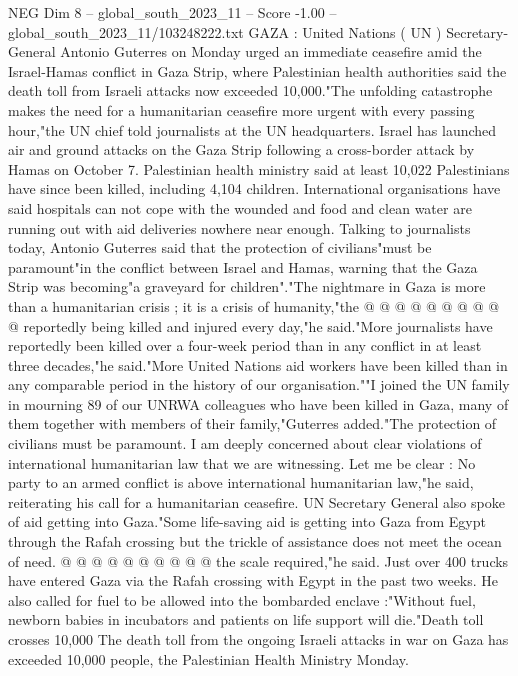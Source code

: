 \begin{textsample}{NEG Dim 8 – global\_south\_2023\_11 – Score -1.00 – global\_south\_2023\_11/103248222.txt}  \label{ex:f8_neg_085}
GAZA : United Nations ( UN ) Secretary-General Antonio Guterres on Monday urged an immediate ceasefire amid the Israel-Hamas conflict in Gaza Strip, where Palestinian health authorities said the death toll from Israeli attacks now exceeded 10,000."The unfolding catastrophe makes the need for a humanitarian ceasefire more urgent with every passing hour,"the UN chief told journalists at the UN headquarters.
Israel has launched air and ground attacks on the Gaza Strip following a cross-border attack by Hamas on October 7.
Palestinian health ministry said at least 10,022 Palestinians have since been killed, including 4,104 children.
International organisations have said hospitals can not cope with the wounded and food and clean water are running out with aid deliveries nowhere near enough.
Talking to journalists today, Antonio Guterres said that the protection of civilians"must be paramount"in the conflict between Israel and Hamas, warning that the Gaza Strip was becoming"a graveyard for children"."The nightmare in Gaza is more than a humanitarian crisis ; it is a crisis of humanity,"the @ @ @ @ @ @ @ @ @ @ reportedly being killed and injured every day,"he said."More journalists have reportedly been killed over a four-week period than in any conflict in at least three decades,"he said."More United Nations aid workers have been killed than in any comparable period in the history of our organisation.""I joined the UN family in mourning 89 of our UNRWA colleagues who have been killed in Gaza, many of them together with members of their family,"Guterres added."The protection of civilians must be paramount.
I am deeply concerned about clear violations of international humanitarian law that we are witnessing.
Let me be clear : No party to an armed conflict is above international humanitarian law,"he said, reiterating his call for a humanitarian ceasefire.
UN Secretary General also spoke of aid getting into Gaza."Some life-saving aid is getting into Gaza from Egypt through the Rafah crossing but the trickle of assistance does not meet the ocean of need. @ @ @ @ @ @ @ @ @ @ the scale required,"he said.
Just over 400 trucks have entered Gaza via the Rafah crossing with Egypt in the past two weeks.
He also called for fuel to be allowed into the bombarded enclave :"Without fuel, newborn babies in incubators and patients on life support will die."Death toll crosses 10,000 The death toll from the ongoing Israeli attacks in war on Gaza has exceeded 10,000 people, the Palestinian Health Ministry Monday.

\end{textsample}
